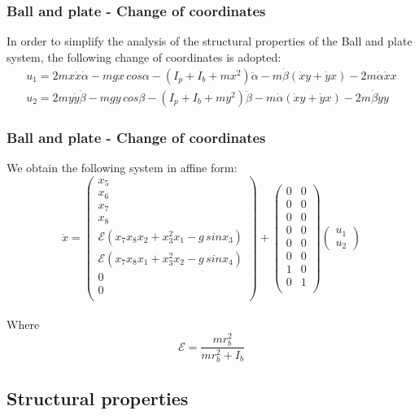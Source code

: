 %
\begin{frame}
\frametitle{Ball and plate - Change of coordinates}
In order to simplify the analysis of the structural properties of the Ball and plate system, the following change of coordinates is adopted:
\begin{align}
	u_1 = 2mx\dot{x}\dot{\alpha} - mgx\,cos\alpha - \left(I_p + I_b + mx^2\right)\ddot{\alpha} - m\dot{\beta}\left(\dot{x}y + \dot{y}x\right) - 2m\dot{\alpha}\dot{x}x \nonumber \\
	u_2 = 2my\dot{y}\dot{\beta} - mgy\,cos\beta - \left(I_p + I_b + my^2\right)\ddot{\beta} - m\dot{\alpha}\left(\dot{x}y + \dot{y}x\right) - 2m\dot{\beta}\dot{y}y \nonumber
\end{align}
\end{frame}
%
\begin{frame}
\frametitle{Ball and plate - Change of coordinates}
We obtain the following system in affine form:
\begin{equation}\label{BP_equations}
\dot{x} =%
	\begin{pmatrix}
	x_5\\
	x_6\\
	x_7\\
	x_8\\
	\mathcal{E}(x_7x_8x_2 + x^2_3x_1 - g\,sinx_3)\\
	\mathcal{E}(x_7x_8x_1 + x^2_3x_2 - g\,sinx_4)\\
	0\\
	0\\
	\end{pmatrix}
	+
	\begin{pmatrix}
		0 &0\\
		0 &0\\
		0 &0\\
		0 &0\\
		0 &0\\
		0 &0\\
		1 &0\\
		0 &1\\
	\end{pmatrix}
	\begin{pmatrix}
		u_1\\
	 	u_2
	\end{pmatrix}
\end{equation}\\[10pt]
Where \[\mathcal{E} = \frac{mr^2_b}{mr^2_b + I_b}\]
\end{frame}
%
\subsection{Structural properties}
